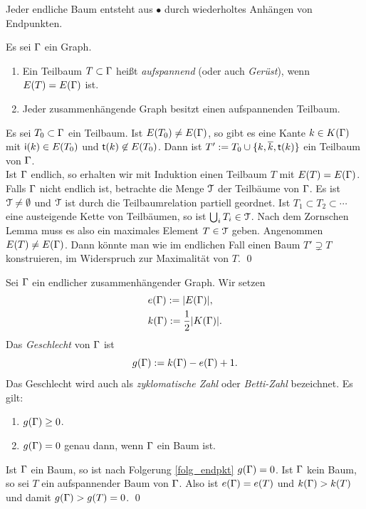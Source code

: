 \documentclass[a4paper, 12pt, twoside]{article}
\begin{document}
\FOLG \label{folg_endpkt}
Jeder endliche Baum entsteht aus $\bullet$ durch wiederholtes
Anhängen von Endpunkten.

\DB Es sei $\Gamma$ ein Graph.
\begin{enumerate}
\item Ein Teilbaum $T\subset \Gamma$ heißt \emph{aufspannend}
(oder auch \emph{Gerüst}), wenn $E(T)=E(\Gamma)$ ist.
\item Jeder zusammenhängende Graph besitzt einen aufspannenden
Teilbaum.
\end{enumerate}
\bew
Es sei $T_0\subset \Gamma$ ein Teilbaum. Ist $E(T_0)\neq E(\Gamma)$,
so gibt es eine Kante $k\in K(\Gamma)$ mit
$\mathsf{i}(k)\in E(T_0)$ und $\mathsf{t}(k)\not\in E(T_0)$.
Dann ist $T' := T_0\cup\{k,\overline{k},\mathsf{t}(k)\}$ ein Teilbaum von
$\Gamma$.\\
Ist $\Gamma$ endlich, so erhalten wir mit Induktion einen
Teilbaum $T$ mit $E(T)=E(\Gamma)$.\\
Falls $\Gamma$ nicht endlich ist, betrachte die Menge $\mathcal{T}$ der
Teilbäume von $\Gamma$. Es ist $\mathcal{T}\neq\emptyset$ und $\mathcal{T}$
ist durch die Teilbaumrelation partiell geordnet.
Ist $T_1\subset T_2\subset \cdots$ eine austeigende Kette von
Teilbäumen, so ist $\bigcup_i T_i \in \mathcal{T}$.
Nach dem Zornschen Lemma muss es also ein maximales Element
$T\in \mathcal{T}$ geben.
Angenommen $E(T)\neq E(\Gamma)$. Dann könnte man wie im endlichen Fall
einen Baum $T'\supsetneq T$ konstruieren, im Widerspruch zur
Maximalität von $T$.
\qed

\DB \label{bem_geschlecht}
Sei $\Gamma$ ein endlicher zusammenhängender Graph.
Wir setzen
\begin{align*}
&e(\Gamma) := |E(\Gamma)|,\\
&k(\Gamma) := \frac{1}{2}|K(\Gamma)|.
\end{align*}
Das \emph{Geschlecht}
von $\Gamma$ ist
\[
g(\Gamma) := k(\Gamma) - e(\Gamma) + 1.
\]
Das Geschlecht wird auch als \emph{zyklomatische Zahl}
oder \emph{Betti-Zahl}
bezeichnet.
Es gilt:
\begin{enumerate}
\item $g(\Gamma) \geq 0$.
\item $g(\Gamma) = 0$ genau dann, wenn $\Gamma$ ein Baum ist.
\end{enumerate}
\bew Ist $\Gamma$ ein Baum, so ist nach Folgerung \ref{folg_endpkt}
$g(\Gamma)=0$. Ist $\Gamma$ kein Baum, so sei $T$ ein aufspannender Baum
von $\Gamma$. Also ist $e(\Gamma)=e(T)$ und $k(\Gamma)>k(T)$ und damit
$g(\Gamma)>g(T)=0$.
\qed
\end{document}
